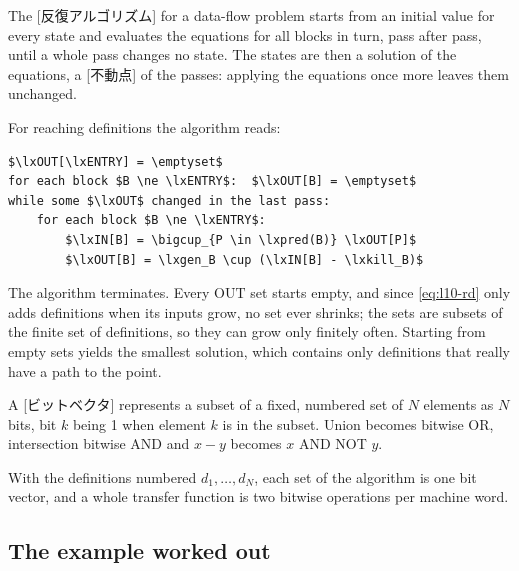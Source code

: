 \documentclass[../main.tex]{subfiles}
\begin{document}
\begin{definition}
  The [反復アルゴリズム] for a data-flow
  problem starts from an initial value for every state and evaluates
  the equations for all blocks in turn, pass after pass, until a whole
  pass changes no state.  The states are then a solution of the
  equations, a [不動点] of the passes: applying the
  equations once more leaves them unchanged.
\end{definition}

For reaching definitions the algorithm reads:
\begin{lstlisting}[mathescape, numbers=none]
$\lxOUT[\lxENTRY] = \emptyset$
for each block $B \ne \lxENTRY$:  $\lxOUT[B] = \emptyset$
while some $\lxOUT$ changed in the last pass:
    for each block $B \ne \lxENTRY$:
        $\lxIN[B] = \bigcup_{P \in \lxpred(B)} \lxOUT[P]$
        $\lxOUT[B] = \lxgen_B \cup (\lxIN[B] - \lxkill_B)$
\end{lstlisting}

The algorithm terminates.  Every $\mathrm{OUT}$ set starts empty, and
since \cref{eq:l10-rd} only adds definitions when its inputs grow, no
set ever shrinks; the sets are subsets of the finite set of
definitions, so they can grow only finitely often.  Starting from empty sets yields the smallest
solution, which contains only definitions that really have a path to
the point.

\begin{definition}
  A [ビットベクタ] represents a subset of a fixed,
  numbered set of $N$ elements as $N$ bits, bit $k$ being 1 when
  element $k$ is in the subset.  Union becomes bitwise OR, intersection
  bitwise AND and $x-y$ becomes $x$ AND NOT $y$.
\end{definition}

With the definitions numbered $d_1,\dots,d_N$, each set of the
algorithm is one bit vector, and a whole transfer function is two
bitwise operations per machine word.

\subsection{The example worked out}
\end{document}
